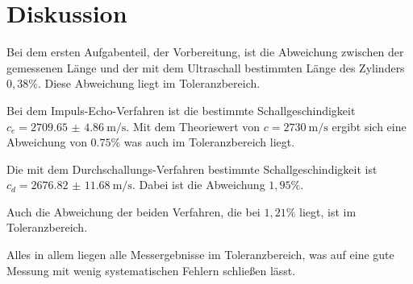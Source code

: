 \section{Diskussion}

Bei dem ersten Aufgabenteil, der Vorbereitung, ist die Abweichung zwischen der gemessenen
Länge und der mit dem Ultraschall bestimmten Länge des Zylinders $0,38 \%$. Diese Abweichung
liegt im Toleranzbereich.

Bei dem Impuls-Echo-Verfahren ist die bestimmte Schallgeschindigkeit $c_e = \SI{2709.65(486)}{\meter\per\second}$.
Mit dem Theoriewert von $c = \SI{2730}{\meter\per\second}$ ergibt sich eine Abweichung von
$0.75 \%$ was auch im Toleranzbereich liegt.

Die mit dem Durchschallungs-Verfahren bestimmte Schallgeschindigkeit ist $c_d = \SI{2676.82(1168)}{\meter\per\second}$.
Dabei ist die Abweichung $1,95 \%$.

Auch die Abweichung der beiden Verfahren, die bei $1,21 \%$ liegt, ist im Toleranzbereich.

Alles in allem liegen alle Messergebnisse im Toleranzbereich, was auf eine gute
Messung mit wenig systematischen Fehlern schließen lässt. 
